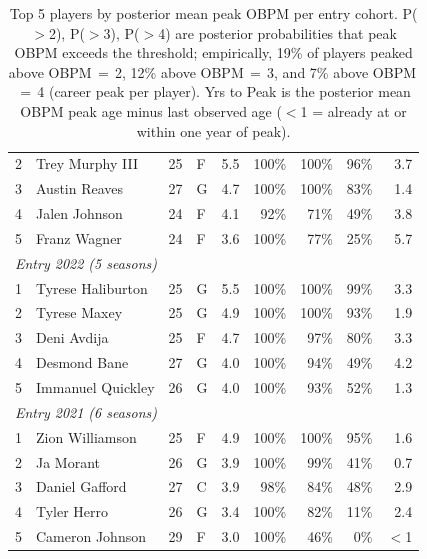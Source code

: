 \begin{table}[htbp]
\begin{tabular}{rlrlrrrrr}
    2 & Trey Murphy III & 25 & F & 5.5 & 100\% & 100\% & 96\% & 3.7 \\
    3 & Austin Reaves & 27 & G & 4.7 & 100\% & 100\% & 83\% & 1.4 \\
    4 & Jalen Johnson & 24 & F & 4.1 & 92\% & 71\% & 49\% & 3.8 \\
    5 & Franz Wagner & 24 & F & 3.6 & 100\% & 77\% & 25\% & 5.7 \\
    \midrule[0.4pt]
    \multicolumn{9}{l}{\textit{Entry 2022 (5 seasons)}} \\
    \midrule
    1 & Tyrese Haliburton & 25 & G & 5.5 & 100\% & 100\% & 99\% & 3.3 \\
    2 & Tyrese Maxey & 25 & G & 4.9 & 100\% & 100\% & 93\% & 1.9 \\
    3 & Deni Avdija & 25 & F & 4.7 & 100\% & 97\% & 80\% & 3.3 \\
    4 & Desmond Bane & 27 & G & 4.0 & 100\% & 94\% & 49\% & 4.2 \\
    5 & Immanuel Quickley & 26 & G & 4.0 & 100\% & 93\% & 52\% & 1.3 \\
    \midrule[0.4pt]
    \multicolumn{9}{l}{\textit{Entry 2021 (6 seasons)}} \\
    \midrule
    1 & Zion Williamson & 25 & F & 4.9 & 100\% & 100\% & 95\% & 1.6 \\
    2 & Ja Morant & 26 & G & 3.9 & 100\% & 99\% & 41\% & 0.7 \\
    3 & Daniel Gafford & 27 & C & 3.9 & 98\% & 84\% & 48\% & 2.9 \\
    4 & Tyler Herro & 26 & G & 3.4 & 100\% & 82\% & 11\% & 2.4 \\
    5 & Cameron Johnson & 29 & F & 3.0 & 100\% & 46\% & 0\% & $<$1 \\
    \bottomrule
  \end{tabular}
  \caption{Top 5 players by posterior mean peak OBPM per entry cohort. P($>$2), P($>$3), P($>$4) are posterior probabilities that peak OBPM exceeds the threshold; empirically, 19\% of players peaked above OBPM\,$=$\,2, 12\% above OBPM\,$=$\,3, and 7\% above OBPM\,$=$\,4 (career peak per player). Yrs to Peak is the posterior mean OBPM peak age minus last observed age ($<$1 = already at or within one year of peak).}
  \label{tab:breakout_cohort}
\end{table}

